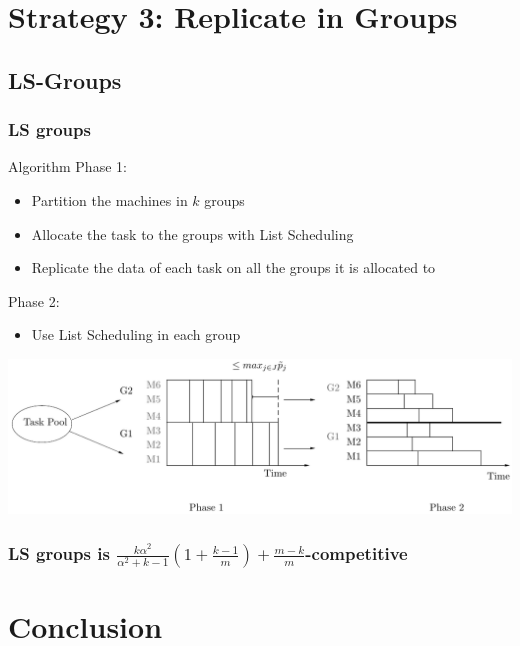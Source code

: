 \documentclass[usenames,dvipsnames]{beamer}
\begin{document}
\section{Strategy 3: Replicate in Groups}

\subsection{LS-Groups}

\begin{frame}
  \frametitle{LS groups}

  \begin{block}{Algorithm}
    Phase 1:
    \begin{itemize}
    \item Partition the machines in $k$ groups
    \item Allocate the task to the groups with List Scheduling
    \item Replicate the data of each task on all the groups it is allocated to
    \end{itemize}
    
    Phase 2:
    \begin{itemize}
    \item Use List Scheduling in each group
    \end{itemize}    
  \end{block}
  
  \includegraphics[width=\textwidth]{figs/model3.pdf}
\end{frame}

\begin{frame}
  \frametitle{LS groups is $ \frac{k\alpha^{2}}{\alpha^{2}+k-1} (1+
  {\frac{k-1}{m}} ) + \frac{m-k}{m}$-competitive}

\end{frame}



\section{Conclusion}
\end{document}
